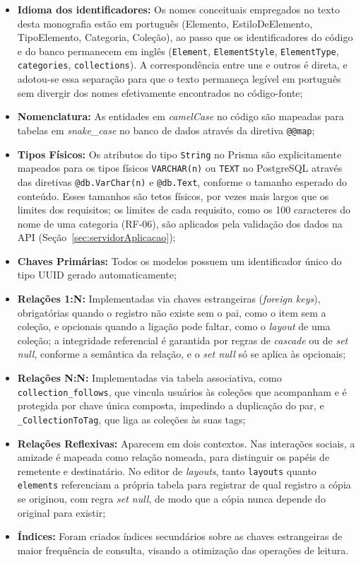 \begin{itemize}
    \item \textbf{Idioma dos identificadores:} Os nomes conceituais empregados no texto desta monografia estão em português (Elemento, EstiloDeElemento, TipoElemento, Categoria, Coleção), ao passo que os identificadores do código e do banco permanecem em inglês (\texttt{Element}, \texttt{ElementStyle}, \texttt{ElementType}, \texttt{categories}, \texttt{collections}). A correspondência entre uns e outros é direta, e adotou-se essa separação para que o texto permaneça legível em português sem divergir dos nomes efetivamente encontrados no código-fonte;
    \item \textbf{Nomenclatura:} As entidades em \textit{camelCase} no código são mapeadas para tabelas em \textit{snake\_case} no banco de dados através da diretiva \texttt{@@map};
    \item \textbf{Tipos Físicos:} Os atributos do tipo \texttt{String} no Prisma são explicitamente mapeados para os tipos físicos \texttt{VARCHAR(n)} ou \texttt{TEXT} no PostgreSQL através das diretivas \texttt{@db.VarChar(n)} e \texttt{@db.Text}, conforme o tamanho esperado do conteúdo. Esses tamanhos são tetos físicos, por vezes mais largos que os limites dos requisitos; os limites de cada requisito, como os 100 caracteres do nome de uma categoria (RF-06), são aplicados pela validação dos dados na API (Seção~\ref{sec:servidorAplicacao});
    \item \textbf{Chaves Primárias:} Todos os modelos possuem um identificador único do tipo UUID gerado automaticamente;
    \item \textbf{Relações 1:N:} Implementadas via chaves estrangeiras (\textit{foreign keys}), obrigatórias quando o registro não existe sem o pai, como o item sem a coleção, e opcionais quando a ligação pode faltar, como o \textit{layout} de uma coleção; a integridade referencial é garantida por regras de \textit{cascade} ou de \textit{set null}, conforme a semântica da relação, e o \textit{set null} só se aplica às opcionais;
    \item \textbf{Relações N:N:} Implementadas via tabela associativa, como \texttt{collection\_follows}, que vincula usuários às coleções que acompanham e é protegida por chave única composta, impedindo a duplicação do par, e \texttt{\_CollectionToTag}, que liga as coleções às suas tags;
    \item \textbf{Relações Reflexivas:} Aparecem em dois contextos. Nas interações sociais, a amizade é mapeada como relação nomeada, para distinguir os papéis de remetente e destinatário. No editor de \textit{layouts}, tanto \texttt{layouts} quanto \texttt{elements} referenciam a própria tabela para registrar de qual registro a cópia se originou, com regra \textit{set null}, de modo que a cópia nunca depende do original para existir;
    \item \textbf{Índices:} Foram criados índices secundários sobre as chaves estrangeiras de maior frequência de consulta, visando a otimização das operações de leitura.
\end{itemize}

